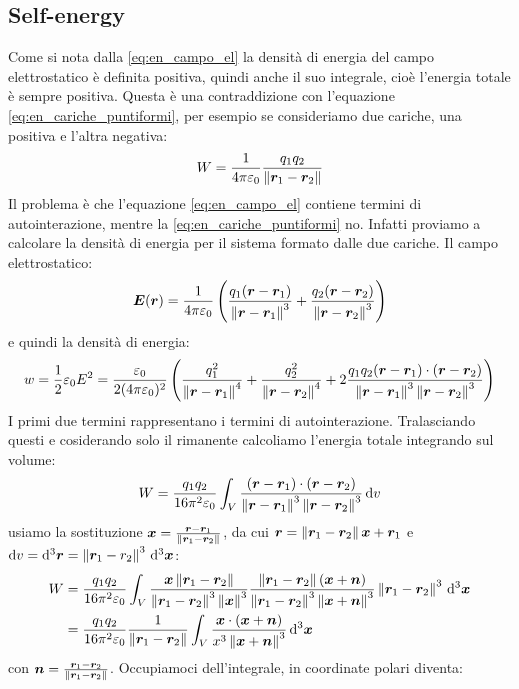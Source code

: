 \subsection{Self-energy}
Come si nota dalla \eqref{eq:en_campo_el} la densità di energia del campo elettrostatico è definita positiva, quindi anche il suo integrale, cioè l'energia totale è sempre positiva. Questa è una contraddizione con l'equazione \eqref{eq:en_cariche_puntiformi}, per esempio se consideriamo due cariche, una positiva e l'altra negativa:
\[
  W = \frac{1}{4\pi\varepsilon_0} \frac{q_1 q_2}{\left\lVert\boldsymbol{r}_1-\boldsymbol{r}_2\right\rVert}
\]
Il problema è che l'equazione \eqref{eq:en_campo_el} contiene termini di autointerazione, mentre la \eqref{eq:en_cariche_puntiformi} no. Infatti proviamo a calcolare la densità di energia per il sistema formato dalle due cariche. Il campo elettrostatico:
\[
  \boldsymbol{E}(\boldsymbol{r}) = \frac{1}{4\pi\varepsilon_0} \left(\frac{q_1(\boldsymbol{r}-\boldsymbol{r}_1)}{\left\lVert\boldsymbol{r}-\boldsymbol{r}_1\right\rVert^3}+\frac{q_2(\boldsymbol{r}-\boldsymbol{r}_2)}{\left\lVert\boldsymbol{r}-\boldsymbol{r}_2\right\rVert^3}\right)
\]
e quindi la densità di energia:
\[
  w = \frac{1}{2}\varepsilon_0 E^2 = \frac{\varepsilon_0}{2(4\pi\varepsilon_0)^2}\left(\frac{q_1^2}{\left\lVert\boldsymbol{r}-\boldsymbol{r}_1\right\rVert^4}+\frac{q_2^2}{\left\lVert\boldsymbol{r}-\boldsymbol{r}_2\right\rVert^4}+2\frac{q_1q_2(\boldsymbol{r}-\boldsymbol{r}_1)\cdot(\boldsymbol{r}-\boldsymbol{r}_2)}{\left\lVert\boldsymbol{r}-\boldsymbol{r}_1\right\rVert^3\left\lVert\boldsymbol{r}-\boldsymbol{r}_2\right\rVert^3}\right)
\]
I primi due termini rappresentano i termini di autointerazione. Tralasciando questi e cosiderando solo il rimanente calcoliamo l'energia totale integrando sul volume:
\[
  W = \frac{q_1q_2}{16\pi^2\varepsilon_0} \int_V \frac{(\boldsymbol{r}-\boldsymbol{r}_1)\cdot(\boldsymbol{r}-\boldsymbol{r}_2)}{\left\lVert\boldsymbol{r}-\boldsymbol{r}_1\right\rVert^3\left\lVert\boldsymbol{r}-\boldsymbol{r}_2\right\rVert^3}\,\mathrm{d} v
\]
usiamo la sostituzione $\boldsymbol{x} = \frac{\boldsymbol{r}-\boldsymbol{r}_1}{\left\lVert\boldsymbol{r}_1-\boldsymbol{r}_2\right\rVert}$, da cui $\boldsymbol{r}=\left\lVert\boldsymbol{r}_1-\boldsymbol{r}_2\right\rVert\boldsymbol{x}+\boldsymbol{r}_1$ e $\mathrm{d} v=\mathrm{d}^3 \boldsymbol{r} = \left\lVert\boldsymbol{r}_1-r_2\right\rVert^3\,\mathrm{d}^3\boldsymbol{x}$:
\begin{equation*}
  \begin{aligned}
    W & = \frac{q_1q_2}{16\pi^2\varepsilon_0} \int_V \frac{\boldsymbol{x}\left\lVert\boldsymbol{r}_1-\boldsymbol{r}_2\right\rVert}{\left\lVert\boldsymbol{r}_1-\boldsymbol{r}_2\right\rVert^3\left\lVert\boldsymbol{x}\right\rVert^3}\frac{\left\lVert\boldsymbol{r}_1-\boldsymbol{r}_2\right\rVert(\boldsymbol{x}+\boldsymbol{n})}{\left\lVert\boldsymbol{r}_1-\boldsymbol{r}_2\right\rVert^3\left\lVert\boldsymbol{x}+\boldsymbol{n}\right\rVert^3} \left\lVert\boldsymbol{r}_1-\boldsymbol{r}_2\right\rVert^3\,\mathrm{d}^3\boldsymbol{x} \\
      & = \frac{q_1q_2}{16\pi^2\varepsilon_0}\frac{1}{\left\lVert\boldsymbol{r}_1-\boldsymbol{r}_2\right\rVert} \int_V \frac{\boldsymbol{x}\cdot (\boldsymbol{x}+\boldsymbol{n})}{x^3\left\lVert\boldsymbol{x}+\boldsymbol{n}\right\rVert^3}\,\mathrm{d}^3\boldsymbol{x}
  \end{aligned}
\end{equation*}
con $\boldsymbol{n}=\frac{\boldsymbol{r}_1-\boldsymbol{r}_2}{\left\lVert\boldsymbol{r}_1-\boldsymbol{r}_2\right\rVert}$. Occupiamoci dell'integrale, in coordinate polari diventa:
